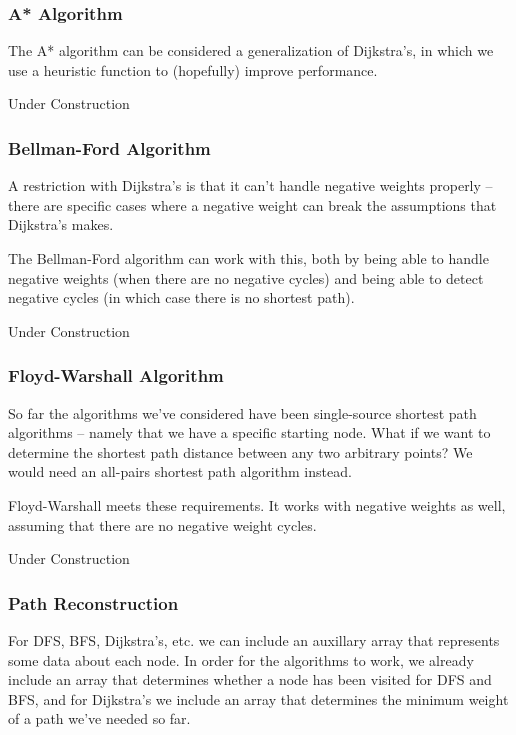 \subsubsection{A* Algorithm}

The A* algorithm can be considered a generalization of Dijkstra's, in which we use a heuristic function to (hopefully) improve performance.

Under Construction

\subsubsection{Bellman-Ford Algorithm}

A restriction with Dijkstra's is that it can't handle negative weights properly -- there are specific cases where a negative weight can break the assumptions that Dijkstra's makes.

The Bellman-Ford algorithm can work with this, both by being able to handle negative weights (when there are no negative cycles) and being able to detect negative cycles (in which case there is no shortest path).

Under Construction

\subsubsection{Floyd-Warshall Algorithm}

So far the algorithms we've considered have been single-source shortest path algorithms -- namely that we have a specific starting node. What if we want to determine the shortest path distance between any two arbitrary points? We would need an all-pairs shortest path algorithm instead.

Floyd-Warshall meets these requirements. It works with negative weights as well, assuming that there are no negative weight cycles.

Under Construction

\subsubsection{Path Reconstruction}

For DFS, BFS, Dijkstra's, etc. we can include an auxillary array that represents some data about each node. In order for the algorithms to work, we already include an array that determines whether a node has been visited for DFS and BFS, and for Dijkstra's we include an array that determines the minimum weight of a path we've needed so far.

